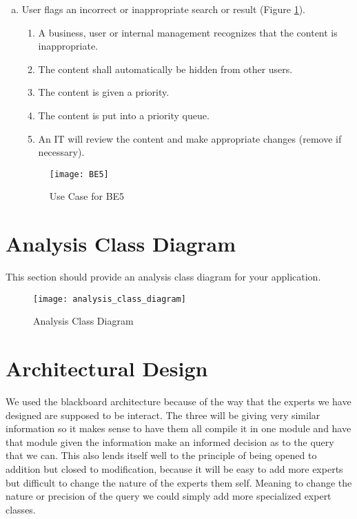 \documentclass[titlepage]{article}
\begin{document}
\begin{enumerate}[a)]
\newpage
	\item User flags an incorrect or inappropriate search or result (Figure \ref{usecase:badsearch}).
		\begin{enumerate}[{BE5}.1]
			\item A business, user or internal management recognizes that the content is inappropriate.
			\item The content shall automatically be hidden from other users.
			\item The content is given a priority.
			\item The content is put into a priority queue.
			\item An IT will review the content and make appropriate changes (remove if necessary).
		\end{enumerate}
	\begin{center}
		\begin{figure}[H]
			\texttt{[image: BE5]}
			\caption{Use Case for BE5}\label{usecase:badsearch}
		\end{figure}
	\end{center}
	
	\end{enumerate}

\newpage

\section{Analysis Class Diagram}
\label{sec:analysis_class_diagram}
This section should provide an analysis class diagram for your application.

\label{sub:system_architecture}
	\begin{center}
		\begin{figure}[H]
			\texttt{[image: analysis\_class\_diagram]}
			\caption{Analysis Class Diagram}\label{diagram:analysisclass}
		\end{figure}
	\end{center}
	


\section{Architectural Design}
\label{sec:architectural_design}
We used the blackboard architecture because of the way that the experts we have designed are supposed to be interact. The three will be giving very similar information so it makes sense to have them all compile it in one module and have that module given the information make an informed decision as to the query that we can. This also lends itself well to the principle of being opened to addition but closed to modification, because it will be easy to add more experts but difficult to change the nature of the experts them self. Meaning to change the nature or precision of the query we could simply add more specialized expert classes.
\end{document}
